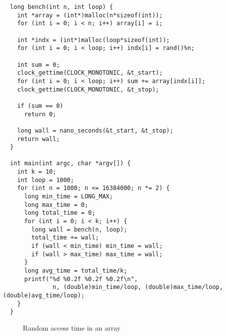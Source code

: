 \documentclass[a4paper,11pt]{article}
\begin{document}
\begin{verbatim}
  long bench(int n, int loop) {
    int *array = (int*)malloc(n*sizeof(int));
    for (int i = 0; i < n; i++) array[i] = i;
    
    int *indx = (int*)malloc(loop*sizeof(int));
    for (int i = 0; i < loop; i++) indx[i] = rand()%n;

    int sum = 0;
    clock_gettime(CLOCK_MONOTONIC, &t_start);
    for (int i = 0; i < loop; i++) sum += array[indx[i]];
    clock_gettime(CLOCK_MONOTONIC, &t_stop);

    if (sum == 0)
      return 0;

    long wall = nano_seconds(&t_start, &t_stop);
    return wall;
  }

  int main(int argc, char *argv[]) {
    int k = 10;
    int loop = 1000;
    for (int n = 1000; n <= 16384000; n *= 2) {
      long min_time = LONG_MAX;
      long max_time = 0;
      long total_time = 0;
      for (int i = 0; i < k; i++) {
        long wall = bench(n, loop);
        total_time += wall;
        if (wall < min_time) min_time = wall;
        if (wall > max_time) max_time = wall;
      }
      long avg_time = total_time/k;
      printf("%d %0.2f %0.2f %0.2f\n", 
              n, (double)min_time/loop, (double)max_time/loop, (double)avg_time/loop);
    }
  }
\end{verbatim}

\begin{figure}[h]
  \centering
  \caption{Random access time in an array}
  \label{fig:random_access}
\end{figure}
\end{document}
